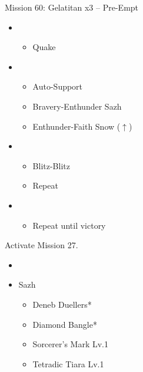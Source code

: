 \begin{battle}{Mission 60: Gelatitan x3 -- Pre-Empt}
	\begin{itemize}
		\item \first
			\begin{itemize}
				\item Quake
			\end{itemize}
		\item \fifth
			\begin{itemize}
				\item Auto-Support
				\item Bravery-Enthunder Sazh
				\item Enthunder-Faith Snow ($\uparrow$)
			\end{itemize}
		\item \sixth
			\begin{itemize}
				\item Blitz-Blitz
				\item Repeat
			\end{itemize}
		\item \second
			\begin{itemize}
				\item Repeat until victory
			\end{itemize}
	\end{itemize}
\end{battle}

Activate Mission 27.

\begin{menu}
	\begin{itemize}
	\paradigm
		\begin{itemize}
			\item {}%
				{\paradigmline{\rav}{\rav}{(\rav)}}%
				{\paradigmline{\com}{\com}{\com}}%
				{\paradigmline{\rav}{\rav}{\med}}%
				{\paradigmline[4]{\com}{\sen}{\med}}%
				{\paradigmline{\syn}{\sen}{(\med)}}%
				{\paradigmline{\com}{\com}{(\med)}}%
		\end{itemize}
	\equip
		\begin{itemize}
			\item Sazh
				\begin{itemize}
					\item Deneb Duellers*
					\item Diamond Bangle*
					\item Sorcerer's Mark Lv.1
					\item Tetradic Tiara Lv.1
				\end{itemize}
		\end{itemize}
	\end{itemize}
\end{menu}

